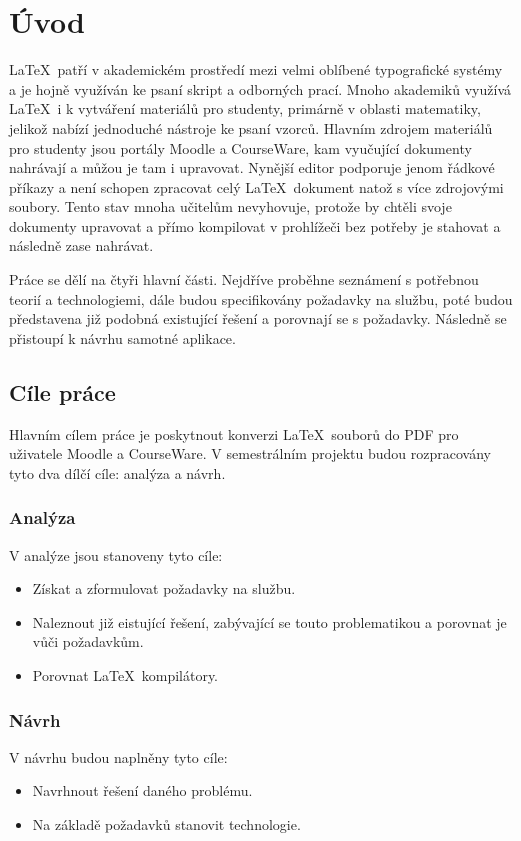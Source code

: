 \chapter{Úvod}
\LaTeX\ patří v akademickém prostředí mezi velmi oblíbené typografické systémy a je hojně využíván ke psaní skript a odborných prací. Mnoho akademiků využívá \LaTeX\ i k vytváření materiálů pro studenty, primárně v oblasti matematiky, jelikož nabízí jednoduché nástroje ke psaní vzorců. Hlavním zdrojem materiálů pro studenty jsou portály Moodle a CourseWare, kam vyučující dokumenty nahrávají a můžou je tam i upravovat. Nynější editor podporuje jenom řádkové příkazy a není schopen zpracovat celý \LaTeX\ dokument natož s více zdrojovými soubory. Tento stav mnoha učitelům nevyhovuje, protože by chtěli svoje dokumenty upravovat a přímo kompilovat v prohlížeči bez potřeby je stahovat a následně zase nahrávat. 

Práce se dělí na čtyři hlavní části. Nejdříve proběhne seznámení s potřebnou teorií a technologiemi, dále budou specifikovány požadavky na službu, poté budou představena již podobná existující řešení a porovnají se s požadavky. Následně se přistoupí k návrhu samotné aplikace.


\section{Cíle práce}
Hlavním cílem práce je poskytnout konverzi \LaTeX\ souborů do PDF pro uživatele Moodle a CourseWare. V semestrálním projektu budou rozpracovány tyto dva dílčí cíle: analýza a návrh.

\subsection{Analýza} 
V analýze jsou stanoveny tyto cíle:

\begin{itemize}
	\item Získat a zformulovat požadavky na službu.
	\item Naleznout již eistující řešení, zabývající se touto problematikou a porovnat je vůči požadavkům.
	\item Porovnat \LaTeX\ kompilátory. 
\end{itemize}
\newpage
\subsection{Návrh}
V návrhu budou naplněny tyto cíle:

\begin{itemize}
	\item Navrhnout řešení daného problému. 
	\item Na základě požadavků stanovit technologie.
\end{itemize}


